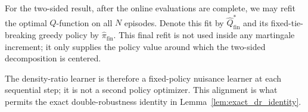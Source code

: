 \documentclass[12pt]{article}
\theoremstyle{remark}\newtheorem{remark}[theorem]{Remark}\theoremstyle{plain}
\begin{document}
For the two-sided result, after the online evaluations are complete,
we may refit the optimal $Q$-function on all $N$ episodes.  Denote
this fit by $\widehat Q_{\mathrm{fin}}^*$ and its fixed-tie-breaking
greedy policy by $\widehat\pi_{\mathrm{fin}}$.  This final refit is
not used inside any martingale increment; it only supplies the policy
value around which the two-sided decomposition is centered.

The density-ratio learner is therefore a fixed-policy nuisance learner
at each sequential step; it is not a second policy optimizer.  This
alignment is what permits the exact double-robustness identity in
Lemma~\ref{lem:exact_dr_identity}.%


\end{document}
